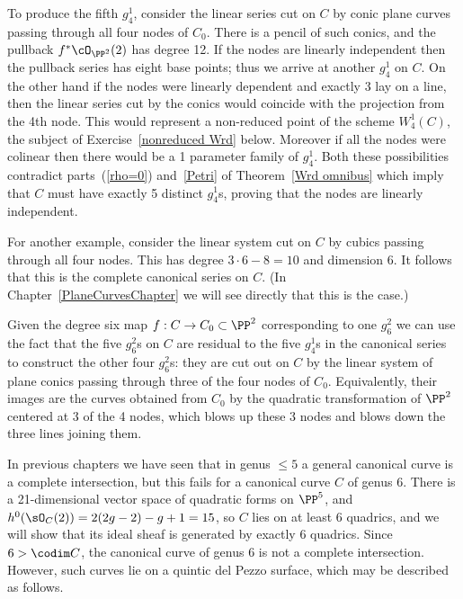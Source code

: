 To produce the fifth $g^1_4$, consider the linear series cut on $C$ by conic plane curves passing through all four nodes of $C_0$. There is a pencil of such conics, and the pullback $f^*\cO_{\PP^2}(2)$ has degree 12.
If the nodes are linearly independent then the pullback series has eight base points; thus we arrive at another $g^1_4$ on $C$. On the other hand if the nodes were linearly dependent and exactly 3 lay on a line, then
the linear series cut by the conics would coincide with the projection from the 4th node. 
This would represent a non-reduced point of the scheme $W^1_4(C)$, the subject of Exercise~\ref{nonreduced Wrd} below. Moreover if all the nodes
were colinear then there would be a 1 parameter family of $g^{1}_{4}$. Both these possibilities contradict
parts~(\ref{rho=0}) and~\ref{Petri} of Theorem~\ref{Wrd omnibus} which imply that $C$ must have exactly 5 distinct $g^1_4$s, proving that the nodes are linearly independent.

For another example, consider the linear system cut on $C$ by cubics passing through all four nodes. This has degree $3\cdot 6 - 8 = 10$ and dimension 6. It follows that this is the complete canonical series on $C$. (In Chapter~\ref{PlaneCurvesChapter} we will see directly that this is the case.)

Given the degree six map $f : C \to C_0 \subset \PP^2$ corresponding to one $g^2_6$ we can use the fact that the five $g^2_6$s on $C$ are residual to the five $g^1_4$s in the canonical series to construct the other four $g^2_6$s: they are cut out on $C$ by the linear system of plane conics passing through three of the four nodes of $C_0$. Equivalently, their images are the curves obtained from $C_{0}$ by the quadratic transformation
of $\PP^{2}$ centered at 3 of the 4 nodes, which blows up these 3 nodes and blows down the three lines
 joining them.
 
 In previous chapters we have seen that in genus $\leq 5$ a general canonical curve is  a complete intersection, but this fails for a canonical curve $C$ of genus 6. There is a 21-dimensional vector space of
quadratic forms on $\PP^5$, and $h^0(\sO_C(2)) = 2(2g-2)-g+1 = 15$, so $C$ lies on at least 6 quadrics, and we will show that its ideal sheaf is generated by exactly 6 quadrics. Since $6>\codim C$, the canonical curve of genus 6 is not a complete intersection. However, such curves lie on a quintic del Pezzo surface, which may be described as follows.


%
 
